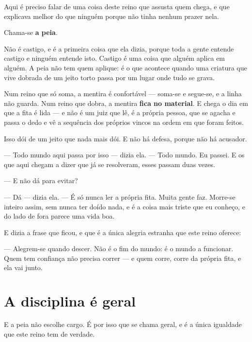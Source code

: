 \documentclass[livro.tex]{subfiles}
\begin{document}
Aqui é preciso falar de uma coisa deste reino que assusta quem chega, e que \Lua explicava melhor
do que ninguém porque não tinha nenhum prazer nela.

Chama-se \textbf{a peia}.

\medskip

Não é castigo, e é a primeira coisa que ela dizia, porque toda a gente entende castigo e ninguém
entende isto. Castigo é uma coisa que alguém aplica em alguém. A peia não tem quem aplique: é o
que acontece quando uma criatura que vive dobrada de um jeito torto passa por um lugar onde tudo
se grava.

Num reino que só soma, a mentira é confortável --- soma-se e segue-se, e a linha não guarda. Num
reino que dobra, a mentira \textbf{fica no material}. E chega o dia em que a fita é lida --- e
não é um juiz que lê, é a própria pessoa, que se agacha e passa o dedo e vê a sequência dos
próprios vincos na ordem em que foram feitos.

Isso dói de um jeito que nada mais dói. E não há defesa, porque não há acusador.

\medskip

--- Todo mundo aqui passa por isso --- dizia ela. --- Todo mundo. Eu passei. E os que aqui chegam
a dizer que já se resolveram, esses passam duas vezes.

--- E não dá para evitar?

--- Dá --- dizia ela. --- É só nunca ler a própria fita. Muita gente faz. Morre-se inteiro assim,
sem nunca ter doído nada, e é a coisa mais triste que eu conheço, e do lado de fora parece uma
vida boa.

\medskip

E dizia a frase que ficou, e que é a única alegria estranha que este reino oferece:

--- Alegrem-se quando descer. Não é o fim do mundo: é o mundo a funcionar. Quem tem confiança não
precisa correr --- e quem corre, corre da própria fita, e ela vai junto.

\section{A disciplina é geral}

E a peia não escolhe cargo. É por isso que se chama geral, e é a única igualdade que este reino
tem de verdade.
\end{document}
